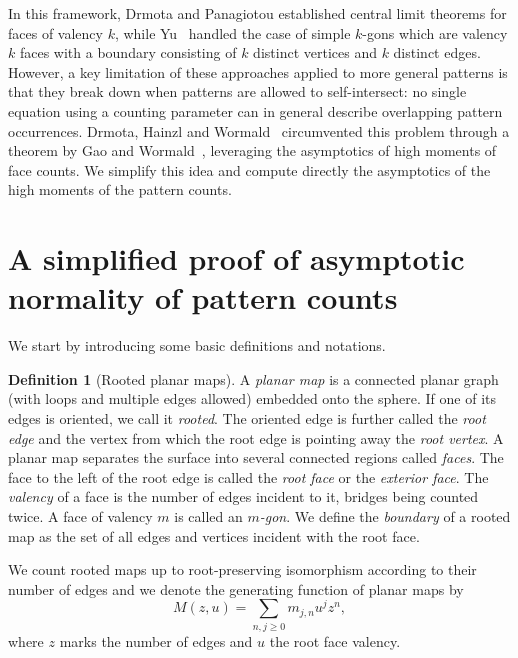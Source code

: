 \documentclass[reqno, 11pt]{amsart}
\theoremstyle{definition}
\newtheorem{definition}{Definition}
\theoremstyle{remark}
\numberwithin{equation}{section}
\begin{document}
In this framework, Drmota and Panagiotou \cite{DrPa} established central limit theorems for faces of valency $k$, while Yu~\cite{Yu} handled the case of simple $k$-gons which are valency $k$ faces with a boundary consisting of $k$ distinct vertices and $k$ distinct edges. However, a key limitation of these approaches applied to more general patterns is that they break down when patterns are allowed to self-intersect: no single equation using a counting parameter can in general describe overlapping pattern occurrences. Drmota, Hainzl and Wormald~\cite{patternocc} circumvented this problem through a theorem by Gao and Wormald~\cite{GaoWormald}, leveraging the asymptotics of high moments of face counts. We simplify this idea and compute directly the asymptotics of the high moments of the pattern counts.\\


\section{A simplified proof of asymptotic normality of pattern counts}

We start by introducing some basic definitions and notations.
\begin{definition}[Rooted planar maps]
    A \emph{planar map} is a connected planar graph (with loops and multiple edges allowed) embedded onto the sphere. If one of its edges is oriented, we call it \emph{rooted}. The oriented edge is further called the \emph{root edge} and the vertex from which the root edge is pointing away the \emph{root vertex}.
    A planar map separates the surface into several connected regions called \emph{faces}. The face to the left of the root edge is called the \emph{root face} or the \emph{exterior face}.
    The \emph{valency} of a face is the number of edges incident to it, bridges being counted twice. A face of valency $m$ is called an \emph{$m$-gon}.
    We define the \emph{boundary} of a rooted map as the set of all edges and vertices incident with the root face.

    We count rooted maps up to root-preserving isomorphism according to their number of edges and we denote the generating function of planar maps by
        \[
            M(z,u) = \sum_{n,j\geq 0} m_{j,n}u^jz^n,
        \]
    where $z$ marks the number of edges and $u$ the root face valency.
\end{definition}
\end{document}
